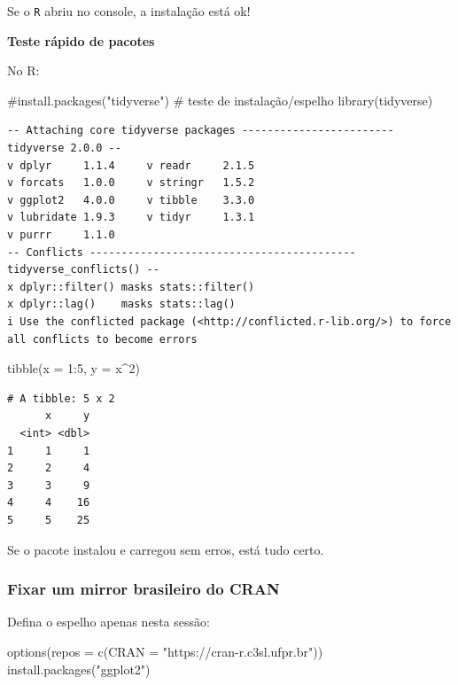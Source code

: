 \documentclass[
  letterpaper,
  DIV=11,
  numbers=noendperiod]{scrreprt}
\newenvironment{Shaded}{\begin{snugshade}}{\end{snugshade}}
\newcommand{\AttributeTok}[1]{\textcolor[rgb]{0.40,0.45,0.13}{#1}}
\newcommand{\CommentTok}[1]{\textcolor[rgb]{0.37,0.37,0.37}{#1}}
\newcommand{\DecValTok}[1]{\textcolor[rgb]{0.68,0.00,0.00}{#1}}
\newcommand{\FunctionTok}[1]{\textcolor[rgb]{0.28,0.35,0.67}{#1}}
\newcommand{\NormalTok}[1]{\textcolor[rgb]{0.00,0.23,0.31}{#1}}
\newcommand{\SpecialCharTok}[1]{\textcolor[rgb]{0.37,0.37,0.37}{#1}}
\newcommand{\StringTok}[1]{\textcolor[rgb]{0.13,0.47,0.30}{#1}}
\begin{document}
Se o \texttt{R} abriu no console, a instalação está ok!

\textbf{Teste rápido de pacotes}

No R:

\begin{Shaded}
\begin{Highlighting}[]
\CommentTok{\#install.packages("tidyverse")   \# teste de instalação/espelho}
\FunctionTok{library}\NormalTok{(tidyverse)}
\end{Highlighting}
\end{Shaded}

\begin{verbatim}
-- Attaching core tidyverse packages ------------------------ tidyverse 2.0.0 --
v dplyr     1.1.4     v readr     2.1.5
v forcats   1.0.0     v stringr   1.5.2
v ggplot2   4.0.0     v tibble    3.3.0
v lubridate 1.9.3     v tidyr     1.3.1
v purrr     1.1.0     
-- Conflicts ------------------------------------------ tidyverse_conflicts() --
x dplyr::filter() masks stats::filter()
x dplyr::lag()    masks stats::lag()
i Use the conflicted package (<http://conflicted.r-lib.org/>) to force all conflicts to become errors
\end{verbatim}

\begin{Shaded}
\begin{Highlighting}[]
\FunctionTok{tibble}\NormalTok{(}\AttributeTok{x =} \DecValTok{1}\SpecialCharTok{:}\DecValTok{5}\NormalTok{, }\AttributeTok{y =}\NormalTok{ x}\SpecialCharTok{\^{}}\DecValTok{2}\NormalTok{)}
\end{Highlighting}
\end{Shaded}

\begin{verbatim}
# A tibble: 5 x 2
      x     y
  <int> <dbl>
1     1     1
2     2     4
3     3     9
4     4    16
5     5    25
\end{verbatim}

Se o pacote instalou e carregou sem erros, está tudo certo.

\subsubsection*{Fixar um mirror brasileiro do
CRAN}\label{fixar-um-mirror-brasileiro-do-cran}

Defina o espelho apenas nesta sessão:

\begin{Shaded}
\begin{Highlighting}[]
\FunctionTok{options}\NormalTok{(}\AttributeTok{repos =} \FunctionTok{c}\NormalTok{(}\AttributeTok{CRAN =} \StringTok{"https://cran{-}r.c3sl.ufpr.br"}\NormalTok{))}
\FunctionTok{install.packages}\NormalTok{(}\StringTok{"ggplot2"}\NormalTok{)}
\end{Highlighting}
\end{Shaded}
\end{document}
